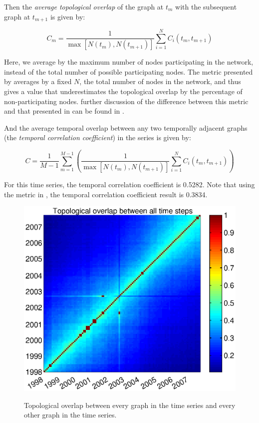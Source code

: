 \documentclass[12pt]{article}
\begin{document}
Then the \emph{average topological overlap} of the graph at \(t_m\) with the subsequent graph at \(t_{m+1}\) is given by:

\begin{equation}
C_m = \frac{1}{\max [N(t_m),N(t_{m+1})]} \sum_{i = 1}^{N} C_i(t_m,t_{m+1})
\label{eq:Cm2}
\end{equation}

Here, we average by the maximum number of nodes participating in the network, instead of the total number of possible participating nodes. The metric presented by \cite{3} averages by a fixed \(N\), the total number of nodes in the network, and thus gives a value that underestimates the topological overlap by the percentage of non-participating nodes. further discussion of the difference between this metric and that presented in \cite{3} can be found in \cite{4}.

And the average temporal overlap between any two temporally adjacent graphs (the \emph{temporal correlation coefficient}) in the series is given by:

\begin{equation}
C = \frac{1}{M-1}\sum_{m=1}^{M-1}  \left( \frac{1}{\max [N(t_m),N(t_{m+1})]} \sum_{i = 1}^{N} C_i(t_m,t_{m+1}) \right)
\label{eq:C2}
\end{equation}

For this time series, the temporal correlation coefficient is 0.5282. Note that using the metric in \cite{3}, the temporal correlation coefficient result is 0.3834.

\begin{figure}[H]
\includegraphics[trim = 0cm 0cm 0cm 0cm, width = .9\textwidth]{Graficos/overlap.eps}
\label{fig:overlap}
\caption{Topological overlap between every graph in the time series and every other graph in the time series.}
\end{figure}
\end{document}
